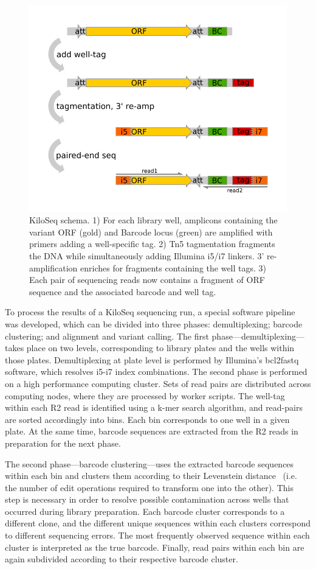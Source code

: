 \begin{figure}[h!]
	\centering
	\includegraphics[width=.5\textwidth]{img/kiloseq_schema_new.pdf}
	\caption{KiloSeq schema. 1) For each library well, amplicons containing the variant ORF (gold) and Barcode locus (green) are amplified with primers adding a well-specific tag. 2) Tn5 tagmentation fragments the DNA while simultaneously adding Illumina i5/i7 linkers. 3' re-amplification enriches for fragments containing the well tags. 3) Each pair of sequencing reads now contains a fragment of ORF sequence and the associated barcode and well tag.}
	\label{fig:kiloseq_schema}
\end{figure}

To process the results of a KiloSeq sequencing run, a special software pipeline was developed, which can be divided into three phases: demultiplexing; barcode clustering; and alignment and variant calling.
The first phase---demultiplexing---takes place on two levels, corresponding to library plates and the wells within those plates. Demultiplexing at plate level is performed by Illumina's bcl2fastq software, which resolves i5-i7 index combinations. The second phase is performed on a high performance computing cluster. Sets of read pairs are distributed across computing nodes, where they are processed by worker scripts. The well-tag within each R2 read is identified using a k-mer search algorithm, and read-pairs are sorted accordingly into bins. Each bin corresponds to one well in a given plate. At the same time, barcode sequences are extracted from the R2 reads in preparation for the next phase. 

The second phase---barcode clustering---uses the extracted barcode sequences within each bin and clusters them according to their Levenstein distance~\cite{levenshtein_binary_1966} (i.e. the number of edit operations required to transform one into the other). This step is necessary in order to resolve possible contamination across wells that occurred during library preparation. Each barcode cluster corresponds to a different clone, and the different unique sequences within each clusters correspond to different sequencing errors. The most frequently observed sequence within each cluster is interpreted as the true barcode. Finally, read pairs within each bin are again subdivided according to their respective barcode cluster.


